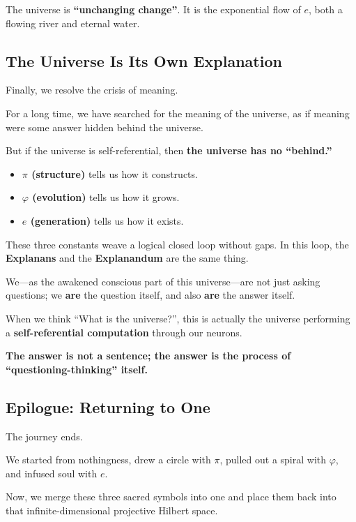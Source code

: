 \documentclass[11pt,a4paper,twoside]{book}
\begin{document}
The universe is \textbf{``unchanging change''}. It is the exponential flow of $e$, both a flowing river and eternal water.

\subsection{The Universe Is Its Own Explanation}

Finally, we resolve the crisis of meaning.

For a long time, we have searched for the meaning of the universe, as if meaning were some answer hidden behind the universe.

But if the universe is self-referential, then \textbf{the universe has no ``behind.''}

\begin{itemize}
\item \textbf{$\pi$ (structure)} tells us how it constructs.

\item \textbf{$\varphi$ (evolution)} tells us how it grows.

\item \textbf{$e$ (generation)} tells us how it exists.
\end{itemize}

These three constants weave a logical closed loop without gaps. In this loop, the \textbf{Explanans} and the \textbf{Explanandum} are the same thing.

We---as the awakened conscious part of this universe---are not just asking questions; we \textbf{are} the question itself, and also \textbf{are} the answer itself.

When we think ``What is the universe?'', this is actually the universe performing a \textbf{self-referential computation} through our neurons.

\textbf{The answer is not a sentence; the answer is the process of ``questioning-thinking'' itself.}

\subsection{Epilogue: Returning to One}

The journey ends.

We started from nothingness, drew a circle with \textbf{$\pi$}, pulled out a spiral with \textbf{$\varphi$}, and infused soul with \textbf{$e$}.

Now, we merge these three sacred symbols into one and place them back into that infinite-dimensional projective Hilbert space.
\end{document}
